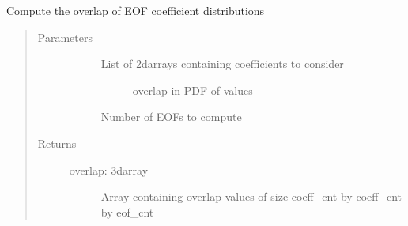 \documentclass[letterpaper,10pt,english]{sphinxmanual}
\begin{document}

\begin{fulllineitems}
\label{\detokenize{stochprop.eofs:stochprop.eofs.compute_overlap}}
Compute the overlap of EOF coefficient distributions
\begin{quote}\begin{description}
\item[{Parameters}] \leavevmode\begin{description}
\item[{}] \leavevmode\begin{description}
\item[{List of 2darrays containing coefficients to consider}] \leavevmode
overlap in PDF of values

\end{description}

\item[{}] \leavevmode
Number of EOFs to compute

\end{description}

\item[{Returns}] \leavevmode\begin{description}
\item[{overlap: 3darray}] \leavevmode
Array containing overlap values of size coeff\_cnt by coeff\_cnt by eof\_cnt

\end{description}

\end{description}\end{quote}

\end{fulllineitems}

\end{document}
